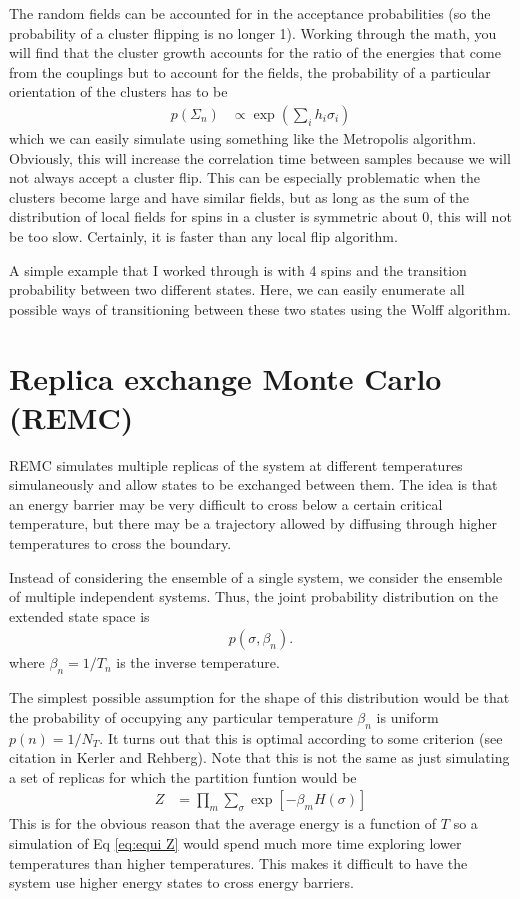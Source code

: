 \documentclass[aps,prl,twocolumn]{revtex4-1}
\begin{document}
The random fields can be accounted for in the acceptance probabilities (so the probability of a cluster flipping is no longer 1). Working through the math, you will find that the cluster growth accounts for the ratio of the energies that come from the couplings but to account for the fields, the probability of a particular orientation of the clusters has to be
\begin{align}
	p(\Sigma_n) &\propto \exp\left(\sum_i h_i\sigma_i\right)
\end{align}
which we can easily simulate using something like the Metropolis algorithm. Obviously, this will increase the correlation time between samples because we will not always accept a cluster flip. This can be especially problematic when the clusters become large and have similar fields, but as long as the sum of the distribution of local fields for spins in a cluster is symmetric about 0, this will not be too slow. Certainly, it is faster than any local flip algorithm.

A simple example that I worked through is with 4 spins and the transition probability between two different states. Here, we can easily enumerate all possible ways of transitioning between these two states using the Wolff algorithm.

\section{Replica exchange Monte Carlo (REMC)}
REMC simulates multiple replicas of the system at different temperatures simulaneously and allow states to be exchanged between them. The idea is that an energy barrier may be very difficult to cross below a certain critical temperature, but there may be a trajectory allowed by diffusing through higher temperatures to cross the boundary.

Instead of considering the ensemble of a single system, we consider the ensemble of multiple independent systems. Thus, the joint probability distribution on the extended state space is
\begin{align}
	p(\sigma,\beta_n).
\end{align}
where $\beta_n = 1/T_n$ is the inverse temperature.

The simplest possible assumption for the shape of this distribution would be that the probability of occupying any particular temperature $\beta_n$ is uniform $p(n) = 1/N_T$. It turns out that this is optimal according to some criterion (see citation in Kerler and Rehberg). Note that this is not the same as just simulating a set of replicas for which the partition funtion would be
\begin{align}
	Z &= \prod_{m} \sum_\sigma \exp\left[ -\beta_m H(\sigma) \right] \label{eq:equi Z}
\end{align}
This is for the obvious reason that the average energy is a function of $T$ so a simulation of Eq \ref{eq:equi Z} would spend much more time exploring lower temperatures than higher temperatures. This makes it difficult to have the system use higher energy states to cross energy barriers. 
\end{document}

